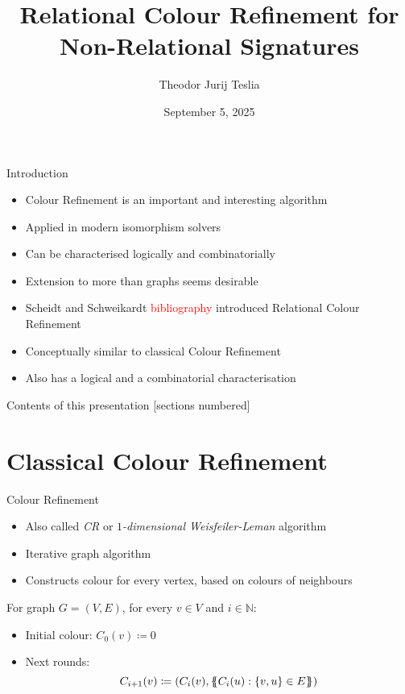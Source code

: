\documentclass[aspectratio=169]{beamer}
\title{Relational Colour Refinement for Non-Relational Signatures}
\date{September 5, 2025}
\author{Theodor Jurij Teslia}
\institute{RWTH Aachen University}
\def\multiset#1{\ensuremath{\left\{\kern-.35em\left\{#1\right\}\kern-.35em\right\}}}
\begin{document}
	
	\maketitle
	
	\begin{frame}{Introduction}
		\begin{itemize}
			\item Colour Refinement is an important and interesting algorithm
			\item Applied in modern isomorphism solvers
			\item Can be characterised logically and combinatorially
			\item Extension to more than graphs seems desirable
			\item Scheidt and Schweikardt \textcolor{red}{bibliography} introduced Relational Colour Refinement
			\item Conceptually similar to classical Colour Refinement
			\item Also has a logical and a combinatorial characterisation
		\end{itemize}
	\end{frame}
	
	\begin{frame}{Contents of this presentation}
		[sections numbered]
		\tableofcontents[hideallsubsections]
	\end{frame}
	
	\section{Classical Colour Refinement}
	
	\begin{frame}{Colour Refinement}
		\begin{itemize}
			\item Also called \emph{CR} or \emph{$1$-dimensional Weisfeiler-Leman} algorithm
			\item Iterative graph algorithm
			\item Constructs colour for every vertex, based on colours of neighbours
		\end{itemize}
		
		\begin{definition}
			For graph $G=(V,E)$, for every $v\in V$ and $i\in \mathbb N$:
			\begin{itemize}
				\item Initial colour: $C_0(v)\coloneqq 0$
				\item Next rounds:$$C_{i+1}(v)\coloneqq(C_i(v),\multiset{C_i(u) : \{v,u\}\in E})$$
			\end{itemize}
		\end{definition}
	\end{frame}
	
\end{document}
